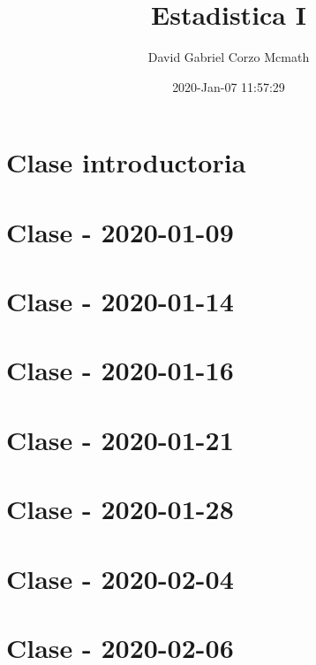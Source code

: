 \documentclass{book}
\title{Estadistica I }
\author{David Gabriel Corzo Mcmath}
\date{2020-Jan-07 11:57:29}
\begin{document}
\maketitle
\tableofcontents

\chapter{Clase introductoria}


\chapter{Clase - 2020-01-09}


\chapter{Clase - 2020-01-14}


\chapter{Clase - 2020-01-16}


\chapter{Clase - 2020-01-21}


\chapter{Clase - 2020-01-28}


\chapter{Clase - 2020-02-04}


\chapter{Clase - 2020-02-06}

\end{document}

